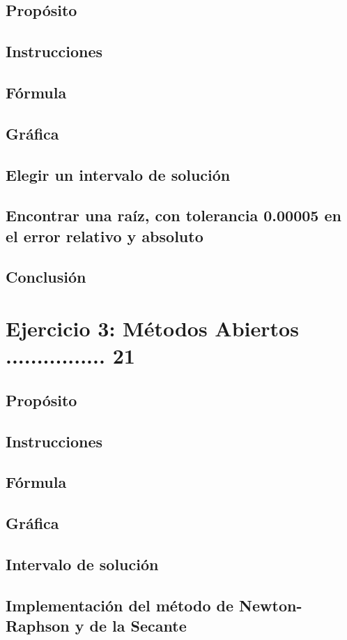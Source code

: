 \documentclass{article}
\begin{document}
\subsection{Propósito}
\subsection{Instrucciones}
\subsection{Fórmula}
\subsection{Gráfica}
\subsection{Elegir un intervalo de solución}
\subsection{Encontrar una raíz, con tolerancia 0.00005 en
el error relativo y absoluto}
\subsection{Conclusión}

\section{Ejercicio 3: Métodos Abiertos ................ 21}
\subsection{Propósito}
\subsection{Instrucciones}
\subsection{Fórmula}
\subsection{Gráfica}
\subsection{Intervalo de solución}
\subsection{Implementación del método de Newton-Raphson y de la Secante}
\end{document}
